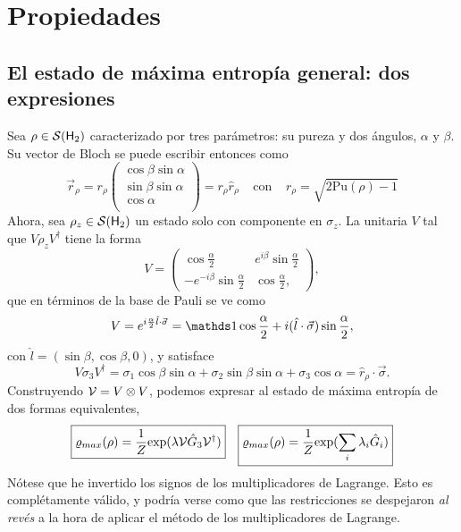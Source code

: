 \section{Propiedades}



\subsection{El estado de máxima entropía general: dos expresiones}
Sea $\rho\in\mathcal{S}({\sf H}_{2})$ caracterizado por tres parámetros: su pureza y dos ángulos, $\alpha$ y $\beta$. Su vector de Bloch se puede escribir entonces como
\begin{equation}
  \vec{r}_{\rho}=r_{\rho}\begin{pmatrix}
    \cos{\beta}\sin{\alpha}\\
    \sin{\beta}\sin{\alpha}\\
    \cos{\alpha}\\
  \end{pmatrix}=r_{\rho}\hat{r}_{\rho} \; \; \; \; \text{con} \; \; \; \; r_{\rho}=\sqrt{2\text{Pu}(\rho)-1}
\end{equation}
Ahora, sea $\rho_{z}\in\mathcal{S}({\sf H}_{2})$ un estado solo con componente en $\sigma_{z}$. La unitaria $V$ tal que $V\rho_{z} V^{\dag}$ tiene la forma
\begin{equation}
  V=
  \begin{pmatrix}
      \cos{\frac{\alpha}{2}} & e^{i\beta}\sin{\frac{\alpha}{2}}\\
      -e^{-i\beta}\sin{\frac{\alpha}{2}}& \cos{\frac{\alpha}{2}},
  \end{pmatrix},
\end{equation}
que en términos de la base de Pauli se ve como
\begin{equation}
  V=e^{i\frac{\alpha}{2} \hat{l}\cdot \vec{\sigma}}=\Id \cos{\frac{\alpha}{2}}+i(\hat{l}\cdot \vec{\sigma})\sin{\frac{\alpha}{2}},
\end{equation}
con $\hat{l}=(\sin{\beta},\cos{\beta},0)$, y satisface
\begin{equation}\label{eq:VsigmazV}
  V\sigma_{3}V^{\dag}=\sigma_{1}\cos{\beta}\sin{\alpha}+\sigma_{2}\sin{\beta}\sin{\alpha}+\sigma_{3}\cos{\alpha}=\hat{r}_{\rho}\cdot\vec{\sigma}.
\end{equation}
Construyendo $\mathcal{V}=V\otimes V$, podemos expresar al estado de máxima entropía de dos formas equivalentes,
\begin{align}\label{eq:MaxEntTwoExpr}
  \boxed{\varrho_{max}(\rho)=\frac{1}{Z}\text{exp}(\lambda\mathcal{V}\hat{G}_{3}\mathcal{V}^{\dag})} && \boxed{\varrho_{max}(\rho)=\frac{1}{Z}\text{exp}(\sum_{i}\lambda_{i}\hat{G}_{i})}
\end{align}
Nótese que he invertido los signos de los multiplicadores de Lagrange. Esto es complétamente válido, y podría verse como que las restricciones se despejaron \textit{al revés} a la hora de aplicar el método de los multiplicadores de Lagrange.

